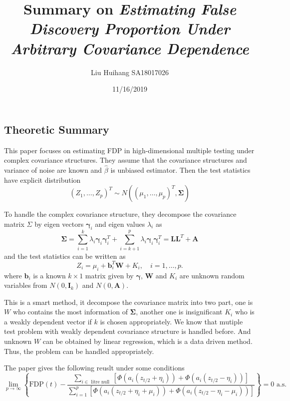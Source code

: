 \documentclass[]{article}
\title{Summary on \emph{Estimating False Discovery Proportion Under Arbitrary Covariance Dependence}}
\author{Liu Huihang \quad SA18017026}
\date{11/16/2019}
\begin{document}
\maketitle

\hypertarget{theoretic-summary}{%
\subsection{Theoretic Summary}\label{theoretic-summary}}
This paper focuses on estimating FDP in high-dimensional multiple testing under complex covariance structures. 
They assume that the covariance structures and variance of noise are known and $\hat{\beta}$ is unbiased estimator. 
Then the test statistics have explicit distribution
\begin{equation}
  \left(Z_{1}, \ldots, Z_{p}\right)^{T} \sim N\left(\left(\mu_{1}, \ldots, \mu_{p}\right)^{T}, \mathbf{\Sigma}\right)
\end{equation}

To handle the complex covariance structure, they decompose the covariance matrix $\Sigma$ by eigen vectors $\mathbf{\gamma}_i$ and eigen values $\lambda_i$ as
\begin{equation}
  \mathbf{\Sigma} = \sum_{i=1}^k \lambda_i \mathbf{\gamma}_i \mathbf{\gamma}_i^T +  \sum_{i=k+1}^p \lambda_i \mathbf{\gamma}_i \mathbf{\gamma}_i^T = \mathbf{LL}^T+ \mathbf{A}
\end{equation}
and the test statistics can be written as 
\begin{equation}
  Z_i = \mu_i + \mathbf{b}_i^T \mathbf{W} + K_i, \quad i=1,\dots,p.
\end{equation}
where $\mathbf{b}_i$ is a known $k\times 1$ matrix given by $\mathbf{\gamma}$, $\mathbf{W}$ and $K_i$ are unknown random variables from $N(0,\mathbf{I}_k)$ and $N(0,\mathbf{A})$.

This is a smart method, it decompose the covariance matrix into two part, one is $W$ who contains the most information of $\mathbf{\Sigma}$, another one is insignificant  $K_i$ who is a weakly dependent vector if $k$ is chosen appropriately. 
We know that mutiple test problem with weakly dependent covariance structure is handled before. 
And unknown $W$ can be obtained by linear regression, which is a data driven method. 
Thus, the problem can be handled appropriately. 

The paper gives the following reuslt under some conditions
\begin{equation}
  \lim _{p \rightarrow \infty} \left\{\mathrm{FDP}(t)
  -\frac{\sum_{i \in \text { litre null }}\left[\Phi\left(a_{i}\left(z_{t / 2}+\eta_{i}\right)\right)+\Phi\left(a_{i}\left(z_{t / 2}-\eta_{i}\right)\right)\right]}{\sum_{i=1}^{p}\left[\Phi\left(a_{i}\left(z_{t / 2}+\eta_{i}+\mu_{i}\right)\right)+\Phi\left(a_{i}\left(z_{t / 2}-\eta_{i}-\mu_{i}\right)\right)\right]}\right\}=0 
  \text{ a.s. }
\end{equation}
\end{document}
